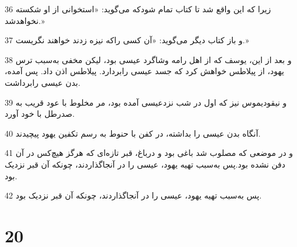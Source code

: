 \par 36 زیرا که این واقع شد تا کتاب تمام شودکه می‌گوید: «استخوانی از او شکسته نخواهدشد.»
\par 37 و باز کتاب دیگر می‌گوید: «آن کسی راکه نیزه زدند خواهند نگریست.»
\par 38 و بعد از این، یوسف که از اهل رامه وشاگرد عیسی بود، لیکن مخفی به‌سبب ترس یهود، از پیلاطس خواهش کرد که جسد عیسی رابردارد. پیلاطس اذن داد. پس آمده، بدن عیسی رابرداشت.
\par 39 و نیقودیموس نیز که اول در شب نزدعیسی آمده بود، مر مخلوط با عود قریب به صدرطل با خود آورد.
\par 40 آنگاه بدن عیسی را بداشته، در کفن با حنوط به رسم تکفین یهود پیچیدند.
\par 41 و در موضعی که مصلوب شد باغی بود و درباغ، قبر تازه‌ای که هرگز هیچ‌کس در آن دفن نشده بود.پس به‌سبب تهیه یهود، عیسی را در آنجاگذاردند، چونکه آن قبر نزدیک بود.
\par 42 پس به‌سبب تهیه یهود، عیسی را در آنجاگذاردند، چونکه آن قبر نزدیک بود.

\chapter{20}

